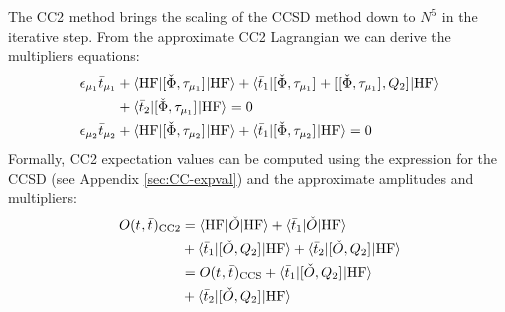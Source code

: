 The \acrshort{CC2} method brings the scaling of the \acrshort{CCSD}
method down to $N^5$ in the iterative step.
From the approximate \acrshort{CC2} Lagrangian we can derive the
multipliers equations:
\begin{subequations}\label{eq:cc2-multipliers}
  \begin{align}
    \epsilon_{\mu_1}\bar{t}_{\mu_1} &+
     \braket{\mathrm{HF} | [ \check{\Phi}, \tau_{\mu_1} ]^{} | \mathrm{HF}}
   + \braket{\bar{t}_{1} |
       [ \check{\Phi}, \tau_{\mu_1} ]^{}
     + [ [ \check{\Phi}, \tau_{\mu_1} ]^{}, Q_2 ]^{}
     | \mathrm{HF}} \nonumber \\
   &+ \braket{\bar{t}_{2} | [ \check{\Phi}, \tau_{\mu_1} ]^{} |
   \mathrm{HF}} = 0 \label{eq:cc2-singles-multipliers} \\
    \epsilon_{\mu_2}\bar{t}_{\mu_2} &+
    \braket{\mathrm{HF} | [ \check{\Phi}, \tau_{\mu_2} ]^{} | \mathrm{HF}}
   + \braket{\bar{t}_{1} |
       [ \check{\Phi}, \tau_{\mu_2} ]^{}
     | \mathrm{HF}}
     = 0 \label{eq:cc2-doubles-multipliers}
  \end{align}
\end{subequations}
Formally, \acrshort{CC2} expectation values can be computed using the
expression for the \acrshort{CCSD} (see Appendix \ref{sec:CC-expval})
and the approximate amplitudes and multipliers:
\begin{equation}\label{eq:cc2-expectation-value}
  \begin{aligned}
  O(t_{}, \bar{t}_{})_\mathrm{CC2}
  &=
  \braket{\mathrm{HF} | \check{O} | \mathrm{HF} }
  + \braket{\bar{t}_{1} | \check{O} | \mathrm{HF} } \\
  &+ \braket{\bar{t}_{1} | [ \check{O}, Q_2 ]^{} | \mathrm{HF} }
  + \braket{\bar{t}_{2} | [ \check{O}, Q_2 ]^{} | \mathrm{HF} } \\
  &=
  O(t_{}, \bar{t}_{})_\mathrm{CCS}
  + \braket{\bar{t}_{1} | [ \check{O}, Q_2 ]^{} | \mathrm{HF} } \\
  & + \braket {
    \bar{t}_{2} | [ \check{O}, Q_2 ]^{} | \mathrm { HF }
  }
  \end{aligned}
\end{equation}

